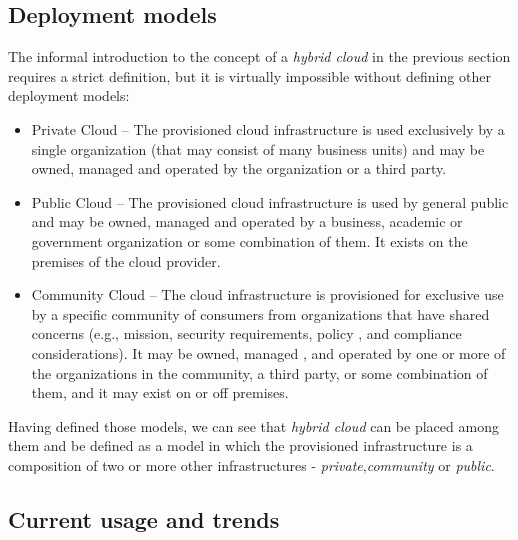\subsection{Deployment models}
The informal introduction to the concept of a \emph{hybrid cloud} in the previous section requires a strict definition, but it is virtually impossible without defining other deployment models:
\begin{itemize}
  \item Private Cloud -- The provisioned cloud infrastructure is used exclusively by a single organization (that may consist of many business units) and may be owned, managed and operated by the organization or a third party.
  \item Public Cloud -- The provisioned cloud infrastructure is used by general public and may be owned, managed and operated by a business, academic or government organization or some combination of them. It exists on the premises of the cloud provider.
  \item Community Cloud -- The cloud infrastructure is provisioned for exclusive use by a specific community of consumers from organizations that have shared concerns (e.g., mission, security requirements, policy , and compliance considerations). It may be owned, managed , and operated by one or more of the organizations in the community, a third party, or some combination of them, and it may exist on or off premises. 
\end{itemize}
Having defined those models, we can see that \emph{hybrid cloud} can be placed among them and be defined as a model in which the provisioned infrastructure is a composition of two or more other infrastructures - \emph{private},\emph{community} or \emph{public}.

\subsection{Current usage and trends}

